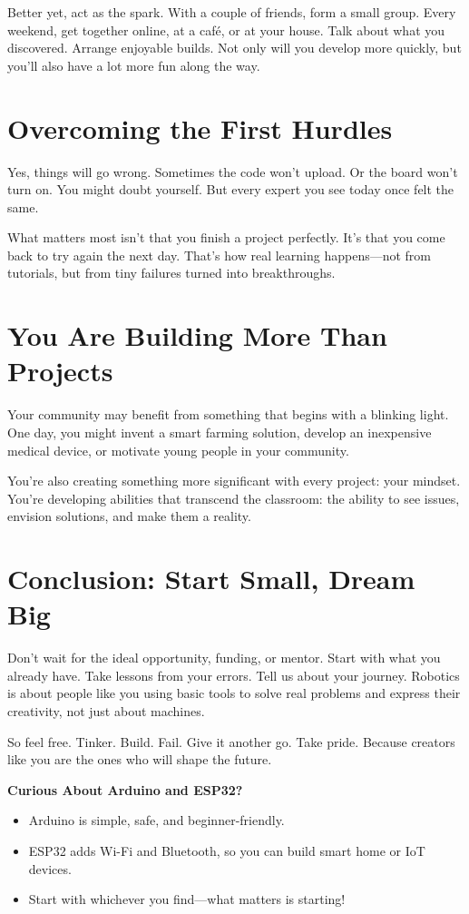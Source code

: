 \documentclass[a4paper,10pt,twocolumn]{memoir}
\begin{document}
Better yet, act as the spark. With a couple of friends, form a small group. Every weekend, get together online, at a café, or at your house. Talk about what you discovered. Arrange enjoyable builds. Not only will you develop more quickly, but you’ll also have a lot more fun along the way.
\section*{Overcoming the First Hurdles}
Yes, things will go wrong. Sometimes the code won’t upload. Or the board won’t turn on. You might doubt yourself. But every expert you see today once felt the same.

What matters most isn’t that you finish a project perfectly. It’s that you come back to try again the next day. That’s how real learning happens—not from tutorials, but from tiny failures turned into breakthroughs.
\section*{You Are Building More Than Projects}
Your community may benefit from something that begins with a blinking light. One day, you might invent a smart farming solution, develop an inexpensive medical device, or motivate young people in your community.

You’re also creating something more significant with every project: your mindset. You’re developing abilities that transcend the classroom: the ability to see issues, envision solutions, and make them a reality.
\section*{Conclusion: Start Small, Dream Big}
Don’t wait for the ideal opportunity, funding, or mentor. Start with what you already have. Take lessons from your errors. Tell us about your journey. Robotics is about people like you using basic tools to solve real problems and express their creativity, not just about machines.

So feel free. Tinker. Build. Fail. Give it another go. Take pride. Because creators like you are the ones who will shape the future.
\begin{center}
\begin{boxedminipage}{0.8\textwidth}
\textbf{Curious About Arduino and ESP32?}
\begin{itemize}
    \item Arduino is simple, safe, and beginner-friendly.
    \item ESP32 adds Wi-Fi and Bluetooth, so you can build smart home or IoT devices.
    \item Start with whichever you find—what matters is starting!
\end{itemize}
\end{boxedminipage}
\end{center}
\end{document}
